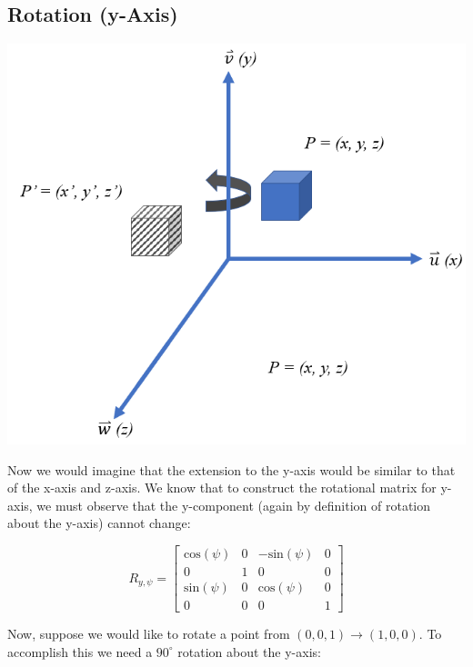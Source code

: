 \documentclass[12pt,letterpaper]{article}
\begin{document}
\subsection{Rotation (y-Axis)}
\begin{center}
\includegraphics[scale=0.75]{yRotation}
\end{center}

Now we would imagine that the extension to the y-axis would be similar to that of the x-axis and z-axis. We know that to construct the rotational matrix for y-axis, we must observe that the y-component (again by definition of rotation about the y-axis) cannot change:

\begin{equation}
    R_{y, \psi} = \begin{bmatrix}
        \text{cos}(\psi)    & 0     & -\text{sin}(\psi) & 0 \\
        0                   & 1     &  0                & 0 \\
       \text{sin}(\psi)     & 0     &  \text{cos}(\psi) & 0 \\
        0                   & 0     &  0                & 1
    \end{bmatrix}
\end{equation}

\newpage

Now, suppose we would like to rotate a point from $(0, 0, 1) \rightarrow (1, 0, 0)$. To accomplish this we need a $90^{\circ}$ rotation about the y-axis:
\end{document}
